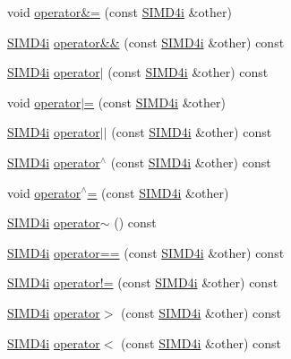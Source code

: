 \begin{DoxyCompactItemize}
\item 
void \hyperlink{class_s_i_m_d4i_ab043f1df60c0c27b01cbad213451d2f4}{operator\&=} (const \hyperlink{class_s_i_m_d4i}{S\+I\+M\+D4i} \&other)
\item 
\hyperlink{class_s_i_m_d4i}{S\+I\+M\+D4i} \hyperlink{class_s_i_m_d4i_a722f24539d12e24b2d7605777f0ef604}{operator\&\&} (const \hyperlink{class_s_i_m_d4i}{S\+I\+M\+D4i} \&other) const 
\item 
\hyperlink{class_s_i_m_d4i}{S\+I\+M\+D4i} \hyperlink{class_s_i_m_d4i_a103763b8ffc5eaf4ef9fb2a19fd3adab}{operator$\vert$} (const \hyperlink{class_s_i_m_d4i}{S\+I\+M\+D4i} \&other) const 
\item 
void \hyperlink{class_s_i_m_d4i_a9cd94e5583c62d123e7299d18f7a2f48}{operator$\vert$=} (const \hyperlink{class_s_i_m_d4i}{S\+I\+M\+D4i} \&other)
\item 
\hyperlink{class_s_i_m_d4i}{S\+I\+M\+D4i} \hyperlink{class_s_i_m_d4i_a9ac0052b953c317a29b736b4f3d4249d}{operator$\vert$$\vert$} (const \hyperlink{class_s_i_m_d4i}{S\+I\+M\+D4i} \&other) const 
\item 
\hyperlink{class_s_i_m_d4i}{S\+I\+M\+D4i} \hyperlink{class_s_i_m_d4i_a4abddc6f10ebb614d6ab0735671acbd8}{operator$^\wedge$} (const \hyperlink{class_s_i_m_d4i}{S\+I\+M\+D4i} \&other) const 
\item 
void \hyperlink{class_s_i_m_d4i_a2115221d09eb9d6eb2d236ee17698e33}{operator$^\wedge$=} (const \hyperlink{class_s_i_m_d4i}{S\+I\+M\+D4i} \&other)
\item 
\hyperlink{class_s_i_m_d4i}{S\+I\+M\+D4i} \hyperlink{class_s_i_m_d4i_abcca6c92e88cad94e0496d57c66be46e}{operator$\sim$} () const 
\item 
\hyperlink{class_s_i_m_d4i}{S\+I\+M\+D4i} \hyperlink{class_s_i_m_d4i_aee9e483d69aa3a38dc893a2091895275}{operator==} (const \hyperlink{class_s_i_m_d4i}{S\+I\+M\+D4i} \&other) const 
\item 
\hyperlink{class_s_i_m_d4i}{S\+I\+M\+D4i} \hyperlink{class_s_i_m_d4i_ac96b9b64b3a615c7e12a96646608df05}{operator!=} (const \hyperlink{class_s_i_m_d4i}{S\+I\+M\+D4i} \&other) const 
\item 
\hyperlink{class_s_i_m_d4i}{S\+I\+M\+D4i} \hyperlink{class_s_i_m_d4i_aa11b40006a0b0fd3d2334df5288eb32e}{operator$>$} (const \hyperlink{class_s_i_m_d4i}{S\+I\+M\+D4i} \&other) const 
\item 
\hyperlink{class_s_i_m_d4i}{S\+I\+M\+D4i} \hyperlink{class_s_i_m_d4i_a03726659925ef53c4af036039788a8c3}{operator$<$} (const \hyperlink{class_s_i_m_d4i}{S\+I\+M\+D4i} \&other) const 
\item 

\end{DoxyCompactItemize}
